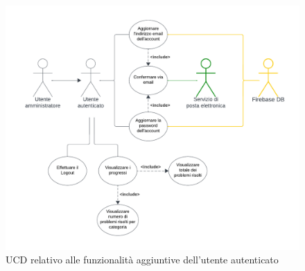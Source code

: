 \documentclass[11pt, a4paper]{article}
\theoremstyle{definition} %
\begin{document}
\begin{figure}[H]
\centering
\hspace*{-1.4cm}
\includegraphics[scale=0.8]{materiale/ucdiagrams/ucaccount.pdf}
\caption{UCD relativo alle funzionalità aggiuntive dell'utente autenticato}
\end{figure}

\newpage
\end{document}
